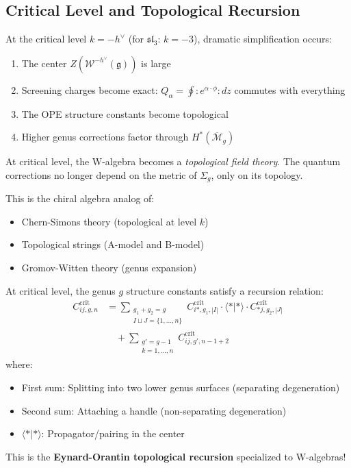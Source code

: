 \subsection{Critical Level and Topological Recursion}

\begin{theorem}
At the critical level $k = -h^\vee$ (for $\mathfrak{sl}_3$: $k = -3$), dramatic simplification occurs:
\begin{enumerate}
\item The center $Z(\mathcal{W}^{-h^\vee}(\mathfrak{g}))$ is large
\item Screening charges become exact: $Q_\alpha = \oint :e^{\alpha \cdot \phi}: dz$ commutes with everything
\item The OPE structure constants become topological
\item Higher genus corrections factor through $H^*(\overline{\mathcal{M}}_g)$
\end{enumerate}
\end{theorem}

\begin{remark}
At critical level, the W-algebra becomes a \emph{topological field theory}. The quantum corrections 
no longer depend on the metric of $\Sigma_g$, only on its topology.

This is the chiral algebra analog of:
\begin{itemize}
\item Chern-Simons theory (topological at level $k$)
\item Topological strings (A-model and B-model)
\item Gromov-Witten theory (genus expansion)
\end{itemize}
\end{remark}

\begin{theorem}\label{thm:topological-recursion}
At critical level, the genus $g$ structure constants satisfy a recursion relation:
\begin{align}
C_{ij,g,n}^{\text{crit}} &= \sum_{\substack{g_1+g_2=g \\ I \sqcup J = \{1,\ldots,n\}}} C_{i*,g_1,|I|}^{\text{crit}} \cdot \langle * | * \rangle \cdot C_{*j,g_2,|J|}^{\text{crit}} \\
&\quad + \sum_{\substack{g'=g-1 \\ k=1,\ldots,n}} C_{ij,g',n-1+2}^{\text{crit}}
\end{align}
where:
\begin{itemize}
\item First sum: Splitting into two lower genus surfaces (separating degeneration)
\item Second sum: Attaching a handle (non-separating degeneration)
\item $\langle * | * \rangle$: Propagator/pairing in the center
\end{itemize}

This is the \textbf{Eynard-Orantin topological recursion} specialized to W-algebras!
\end{theorem}

